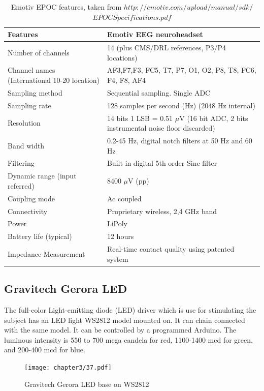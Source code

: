 \newpage
\begin{table}[ht]
\centering
\begin{tabular}{| m{.47\linewidth} | m{.47\linewidth} |}
			
			\hline 
			\textbf{Features} & \textbf{Emotiv EEG neuroheadset}  \\
			\hline 
			Number of channels & 14 (plus CMS/DRL references, P3/P4 locations)   \\
			\hline 
			Channel names (International 10-20 location)  & AF3,F7,F3, FC5, T7, P7, O1, O2, P8, T8, FC6, F4, F8, AF4  \\
			\hline 
			Sampling method & Sequential sampling. Single ADC \\
			\hline 
			Sampling rate & 128 samples per second (Hz) (2048 Hz internal) \\
			\hline
			Resolution & 14 bits 1 LSB = 0.51 $\mu$V (16 bit ADC, 2 bits instrumental noise floor discarded) \\
			\hline
			Band width & 0.2-45 Hz, digital notch filters at 50 Hz and 60 Hz\\
			\hline
			Filtering & Built in digital 5th order Sinc filter\\
            \hline
			Dynamic range (input referred) & 8400 $\mu$V (pp)\\
            \hline
			Coupling mode & Ac coupled\\
            \hline
			Connectivity & Proprietary wireless, 2,4 GHz band\\
            \hline
			Power & LiPoly \\
            \hline
			Battery life (typical) & 12 hours \\
            \hline
			Impedance Measurement & Real-time contact quality using patented system \\
            \hline
		\end{tabular}
        
\caption{Emotiv EPOC features, taken from \textbf{$http://emotiv.com/upload/manual/sdk/$
$EPOCSpecifications.pdf$}}
\label{table:1}
\end{table}

\newpage
\subsection{Gravitech Gerora LED\cite{ref13}}

\hspace{1.5cm} The full-color Light-emitting diode (LED) driver which is use for stimulating the subject has an LED light WS2812 model mounted on. It can chain connected with the same model. It can be controlled by a programmed Arduino. The luminous intensity is 550 to 700 mega candela for red, 1100-1400 mcd for green, and 200-400 mcd for blue.
\begin{figure}[ht]
	\centering
	\texttt{[image: chapter3/37.pdf]}
	\caption{Gravitech Gerora LED base on WS2812}
\end{figure}
